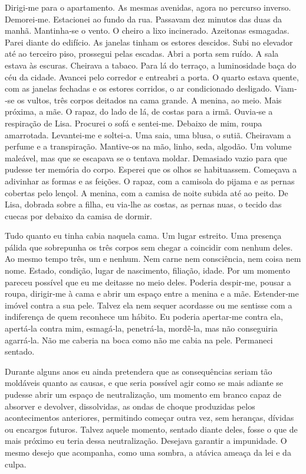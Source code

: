 Dirigi­‑me para o apartamento. As mesmas avenidas, agora no percurso
inverso. Demorei­‑me. Estacionei ao fundo da rua. Passavam dez minutos
das duas da manhã. Mantinha­‑se o vento. O cheiro a lixo incinerado.
Azeitonas esmagadas. Parei diante do edifício. As janelas tinham os
estores descidos. Subi no elevador até ao terceiro piso, prossegui pelas
escadas. Abri a porta sem ruído. A sala estava às escuras. Cheirava a
tabaco. Para lá do terraço, a luminosidade baça do céu da cidade.
Avancei pelo corredor e entreabri a porta. O quarto estava quente, com
as janelas fechadas e os estores corridos, o ar condicionado desligado.
Viam­‑se os vultos, três corpos deitados na cama grande. A menina, ao
meio. Mais próxima, a mãe. O rapaz, do lado de lá, de costas para a
irmã. Ouvia­‑se a respiração de Lisa. Procurei o sofá e sentei­‑me.
Debaixo de mim, roupa amarrotada. Levantei­‑me e soltei­‑a. Uma saia,
uma blusa, o sutiã. Cheiravam a perfume e a transpiração. Mantive­‑os na
mão, linho, seda, algodão. Um volume maleável, mas que se escapava se o
tentava moldar. Demasiado vazio para que pudesse ter memória do corpo.
Esperei que os olhos se habituassem. Começava a adivinhar as formas e as
feições. O rapaz, com a camisola do pijama e as pernas cobertas pelo
lençol. A menina, com a camisa de noite subida até ao peito. De Lisa,
dobrada sobre a filha, eu via­‑lhe as costas, as pernas nuas, o tecido
das cuecas por debaixo da camisa de dormir.

Tudo quanto eu tinha cabia naquela cama. Um lugar estreito. Uma presença
pálida que sobrepunha os três corpos sem chegar a coincidir com nenhum
deles. Ao mesmo tempo três, um e nenhum. Nem carne nem consciência, nem
coisa nem nome. Estado, condição, lugar de nascimento, filiação, idade.
Por um momento pareceu possível que eu me deitasse no meio deles.
Poderia despir­‑me, pousar a roupa, dirigir­‑me à cama e abrir um espaço
entre a menina e a mãe. Estender­‑me imóvel contra a sua pele. Talvez
ela nem sequer acordasse ou me sentisse com a indiferença de quem
reconhece um hábito. Eu poderia apertar­‑me contra ela, apertá­‑la
contra mim, esmagá­‑la, penetrá­‑la, mordê­‑la, mas não conseguiria
agarrá­‑la. Não me caberia na boca como não me cabia na pele. Permaneci
sentado.

Durante alguns anos eu ainda pretendera que as consequências seriam tão
moldáveis quanto as causas, e que seria possível agir como se mais
adiante se pudesse abrir um espaço de neutralização, um momento em
branco capaz de absorver e devolver, dissolvidas, as ondas de choque
produzidas pelos acontecimentos anteriores, permitindo começar outra
vez, sem heranças, dívidas ou encargos futuros. Talvez aquele momento,
sentado diante deles, fosse o que de mais próximo eu teria dessa
neutralização. Desejava garantir a impunidade. O mesmo desejo que
acompanha, como uma sombra, a atávica ameaça da lei e da culpa.

